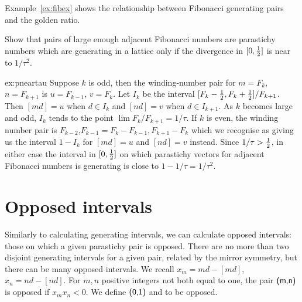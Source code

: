 Example~\ref{ex:fibex} shows the relationship between Fibonacci generating pairs and the golden ratio. 


\begin{jExercise}\label{ex:pneartau}
	Show that  pairs of large enough adjacent Fibonacci numbers are parastichy numbers which are generating in a lattice only if the divergence in $[0,\textstyle{\frac{1}{2}}]$ is near to $1/\tau^2$.
	\label{ex:fibex}
\end{jExercise}
\begin{jAnswer}{ex:pneartau}{
			Suppose $k$ is odd, then the winding-number pair for 
	$m=F_k$, $n=F_{k+1}$ is $u=F_{k-1}$, $v=F_{k}$. 
	Let $I_k$ be the interval $[F_k-\textstyle{\frac{1}{2}},F_k+\textstyle{\frac{1}{2}}]/F_{k+1}$. 
	Then $[md]=u$ when $d\in I_k$ and $[nd]=v$ when $d\in I_{k+1}$.
	As $k$ becomes large and odd, $I_k$ tends to the point $\lim F_k/F_{k+1}=1/\tau$.
	If $k$ is even, the winding number pair is $F_{k-2}$,$F_{k-1} = F_{k}-F_{k-1},F_{k+1}-F_k$ which we recognise as giving us the interval $1-I_k$ for $[md]=u$ and $[nd]=v$ instead.  
Since $1/\tau>\textstyle{\frac{1}{2}}$, in either case the interval in $[0,\textstyle{\frac{1}{2}}]$ on which
parastichy vectors for adjacent Fibonacci numbers
 is generating is close to $1-1/\tau=1/\tau^2$. 	
}
\end{jAnswer}



\section{Opposed intervals}
Similarly to calculating generating intervals, we can calculate opposed intervals: those on which a given parastichy pair is opposed. There are no more than two disjoint generating intervals for a given pair, related by the mirror symmetry, but there can be many opposed intervals. 
We recall 
$
x_m = m d - [ m d]$,
$
x_n = n d - [ n d ].
$
For $m,n$ positive integers not both equal to one, the pair $\textsf{(m,n)}$ is {opposed} if $x_m x_n <0$.
We define $\textsf{(0,1)}$  and   to be opposed.

